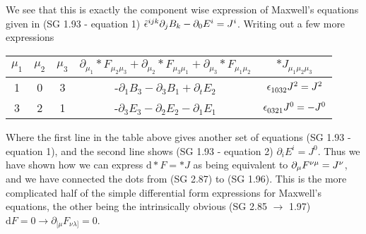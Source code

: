 %
We see that this is exactly the component wise expression of Maxwell's equations given in (SG 1.93 - equation 1) $\tilde{\epsilon}\indices{^{ijk}}\partial_j B_k - \partial_0 E^i = J^i$. Writing out a few more expressions 
%
\begin{center}
	\begin{tabular}{| c | c | c | c | c |} 
		\hline
		$\mu_1$ & $\mu_2$ & $\mu_3$ & $\partial_{\mu_1} \ast F_{\mu_2\mu_3} + \partial_{\mu_2} \ast F_{\mu_3\mu_1} + \partial_{\mu_3} \ast F_{\mu_1\mu_2}$ & $\ast J_{\mu_1 \mu_2 \mu_3}$ \\
		\hline\hline
		1 & 0 & 3 &  -$\partial_{1} B_3 - \partial_{3} B_1 + \partial_{t} E_2$ & $\epsilon\indices{_{{1}{0}{3}{2}}}J^2 = J^2$\\
		3 & 2 & 1 &  -$\partial_{3} E_3 - \partial_{2} E_2 - \partial_{1} E_1$ & $\epsilon\indices{_{{0}{3}{2}{1}}}J^0 = -J^0$\\
		\hline
	\end{tabular}
\end{center}
%
Where the first line in the table above gives another set of equations (SG 1.93 - equation 1), and the second line shows (SG 1.93 - equation 2) $\partial_i E^i = J^0$. Thus we have shown how we can express $ \textrm{d} \ast F = \ast J $ as being equivalent to $\partial_\mu F\indices{^{\nu\mu}} = J^\nu$, and we have connected the dots from (SG 2.87) to (SG 1.96). This is the more complicated half of the simple differential form expressions for Maxwell's equations, the other being the intrinsically obvious (SG 2.85 $\rightarrow$ 1.97) $ \textrm{d} F = 0 \rightarrow \partial_{[\mu}F_{\nu\lambda]} = 0$. 

